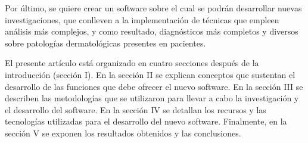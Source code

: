 \documentclass[conference]{IEEEtran}
\begin{document}
Por \'{u}ltimo, se quiere crear un software sobre el cual se podr\'{a}n desarrollar nuevas investigaciones, que conlleven a la implementaci\'{o}n de t\'{e}cnicas que empleen an\'{a}lisis m\'{a}s complejos, y como resultado, diagn\'{o}sticos m\'{a}s completos y diversos sobre patolog\'{i}as dermatol\'{o}gicas presentes en pacientes.

El presente art\'{i}culo est\'{a} organizado en cuatro secciones despu\'{e}s de la introducci\'{o}n (secci\'{o}n I). En la secci\'{o}n II se explican conceptos que sustentan el desarrollo de las funciones que debe ofrecer el nuevo software. En la secci\'{o}n III se describen las metodolog\'{i}as que se utilizaron para llevar a cabo la investigaci\'{o}n y el desarrollo del software. En la secci\'{o}n IV se detallan los recursos y las tecnolog\'{i}as utilizadas para el desarrollo del nuevo software. Finalmente, en la secci\'{o}n V se exponen los resultados obtenidos y las conclusiones.


%
%

\end{document}
